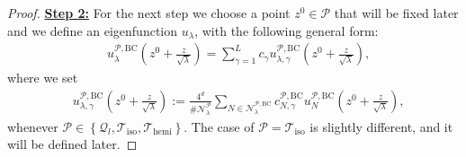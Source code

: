 \documentclass{amsart}
\theoremstyle{definition}
\theoremstyle{remark}
\numberwithin{equation}{section}
\theoremstyle{definition}
\theoremstyle{remark}
\begin{document}
\begin{proof}
\textbf{	\underline{Step 2:}} For the next step we choose a point $z^0\in \mathcal{P}$ that will be fixed later and we define an eigenfunction $u_\lambda$, with the following general form: 
	\begin{equation}
		\begin{aligned}
			&u_\lambda^{\mathcal{P},\mathrm{BC}}\left(z^0+\frac{z}{\sqrt{\lambda}}\right)=\sum_{\gamma=1}^{L}c_\gamma u_{\lambda,\gamma}^{\mathcal{P},\mathrm{BC}}\left(z^0+\frac{z}{\sqrt{\lambda}}\right),
		\end{aligned}
	\end{equation}where we set
    \begin{equation}\label{eigenPNF}
		\begin{aligned}
			& u_{\lambda,\gamma}^{\mathcal{P},\mathrm{BC}}\left(z^0+\frac{z}{\sqrt{\lambda}}\right):=\frac{4^{d}}{\#\mathcal{N}_\lambda^{\mathcal{P}}}\sum_{N\in\mathcal{N}_\lambda^{\mathcal{P},\mathrm{BC}}}c_{N,\gamma}^{\mathcal{P},\mathrm{BC}}u_N^{\mathcal{P},\mathrm{BC}}\left(z^0+\frac{z}{\sqrt{\lambda}}\right),
		\end{aligned}
	\end{equation}whenever $\mathcal{P}\in\left\{\mathcal{Q}_l,\mathcal{T}_\mathrm{iso},\mathcal{T}_\mathrm{hemi}\right\}$. The case of $\mathcal{P}=\mathcal{T}_\mathrm{iso}$ is slightly different, and it will be defined later.
    

\end{proof}
\end{document}
